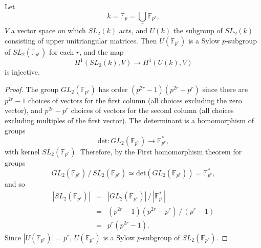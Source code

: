 \begin{example}\label{sl2ab}
	Let
	\begin{displaymath}
		k = \bar{\mathbb{F}_p} = \bigcup_r \mathbb{F}_{p^r},
	\end{displaymath}
	$V$ a vector space on which $SL_2(k)$ acts, and $U(k)$ the subgroup of $SL_2(k)$ consisting of upper unitriangular matrices. Then $U(\mathbb{F}_{p^r})$ is a Sylow $p$-subgroup of $SL_2(\mathbb{F}_{p^r})$ for each $r$, and the map
	\begin{displaymath}
		H^1(SL_2(k), V) \rightarrow H^1(U(k), V)
	\end{displaymath}
	is injective.
\end{example}
\begin{proof}
	The group $GL_2(\mathbb{F}_{p^r})$ has order $(p^{2r} - 1)(p^{2r} - p^r)$ since there are $p^{2r} - 1$ choices of vectors for the first column (all choices excluding the zero vector), and $p^{2r} - p^r$ choices of vectors for the second column (all choices excluding multiples of the first vector). The determinant is a homomorphism of groups
	\begin{displaymath}
		\mathrm{det}:GL_2(\mathbb{F}_{p^r}) \rightarrow \mathbb{F}^*_{p^r},
	\end{displaymath}
	with kernel $SL_2(\mathbb{F}_{p^r})$. Therefore, by the First homomorphism theorem for groups
	\begin{displaymath}
		GL_2(\mathbb{F}_{p^r})\,/\,SL_2(\mathbb{F}_{p^r}) \simeq \mathrm{det}(GL_2(\mathbb{F}_{p^r})) = \mathbb{F}^*_{p^r},
	\end{displaymath}
	and so
	\begin{eqnarray*}
		|SL_2(\mathbb{F}_{p^r})|
		&=& |GL_2(\mathbb{F}_{p^r})|\,/\,|\mathbb{F}^*_{p^r}|\\
		&=& (p^{2r} - 1)(p^{2r} - p^r)\,/\,(p^r - 1)\\
		&=& p^r(p^{2r} - 1).
	\end{eqnarray*}
	Since $|U(\mathbb{F}_{p^r})| = p^r$, $U(\mathbb{F}_{p^r})$ is a Sylow $p$-subgroup of $SL_2(\mathbb{F}_{p^r})$.
	

\end{proof}

